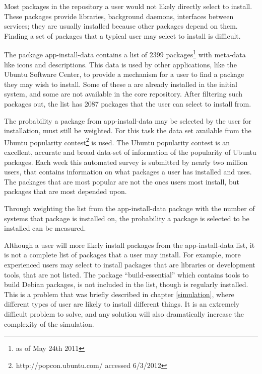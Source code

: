 Most packages in the repository a user would not likely directly select to install.
These packages provide libraries, background daemons, interfaces between services; they are usually installed because other packages depend on them.
Finding a set of packages that a typical user may select to install is difficult.

The package app-install-data contains a list of 2399 packages\footnote{as of May 24th 2011} with meta-data like icons and descriptions.
This data is used by other applications, like the Ubuntu Software Center, to provide a mechanism for a user to find a package they may wish to install.
Some of these a are already installed in the initial system, and some are not available in the core repository.
After filtering such packages out, the list has 2087 packages that the user can select to install from. 

The probability a package from app-install-data may be selected by the user for installation, must still be weighted.
For this task the data set available from the Ubuntu popularity contest\footnote{http://popcon.ubuntu.com/ accessed 6/3/2012} is used.
The Ubuntu popularity contest is an excellent, accurate and broad data-set of information of the popularity of Ubuntu packages.
Each week this automated survey is submitted by nearly two million users, that contains information on what packages a user has installed and uses.
The packages that are most popular are not the ones users most install, but packages that are most depended upon.

Through weighting the list from the app-install-data package with the number of systems that package is installed on,
the probability a package is selected to be installed can be measured.

Although a user will more likely install packages from the app-install-data list, it is not a complete list of packages that a user may install. 
For example, more experienced users may select to install packages that are libraries or development tools, that are not listed.
The package ``build-essential'' which contains tools to build Debian packages, is not included in the list, though is regularly installed.
This is a problem that was briefly described in chapter \ref{simulation}, where different types of user are likely to install different things.
It is an extremely difficult problem to solve, and any solution will also dramatically increase the complexity of the simulation.




